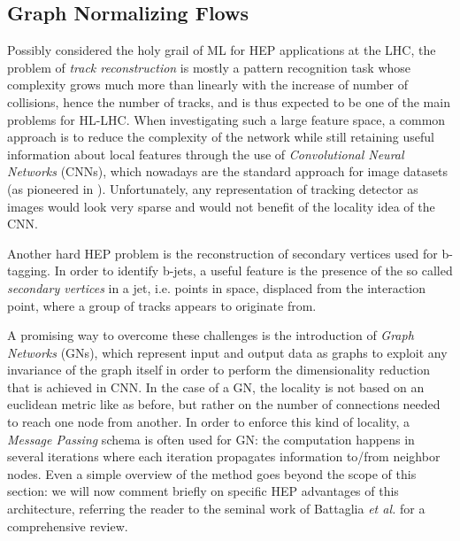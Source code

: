 \subsection{Graph Normalizing Flows}

Possibly considered the holy grail of ML for HEP applications at the LHC, the problem of \emph{track reconstruction} is mostly a pattern recognition task whose complexity grows much more than linearly with the increase of number of collisions, hence the number of tracks, and is thus expected to be one of the main problems for HL-LHC. When investigating such a large feature space, a common approach is to reduce the complexity of the network while still retaining useful information about local features through the use of \emph{Convolutional Neural Networks} (CNNs), which nowadays are the standard approach for image datasets (as pioneered in \cite{simonyan2015deep}).
Unfortunately, any representation of tracking detector as images
would look very sparse and would not benefit of the locality idea of the CNN. 

Another hard HEP problem is the reconstruction of secondary vertices used for b-tagging. In order to identify b-jets, a useful feature is the presence of the so called \emph{secondary vertices} in a jet, i.e. points in space, displaced from the interaction point, where a group of tracks
appears to originate from.

A promising way to overcome these challenges is the introduction of \emph{Graph Networks} (GNs), which represent input and output data as graphs to exploit any invariance of the graph itself in order to perform the dimensionality reduction that is achieved in CNN. In the case of a GN, the locality is not based on an euclidean metric like as before, but rather on the number of connections needed to reach one node from another. In order to enforce this kind of locality, a \emph{Message Passing} schema is often used for GN: the computation happens in several iterations where each iteration propagates information to/from neighbor nodes. Even a simple overview of the method goes beyond the scope of this section: we will now comment briefly on specific HEP advantages of this architecture, referring the reader to the seminal work of Battaglia \emph{et al.} \cite{battaglia2018relational} for a comprehensive review.

